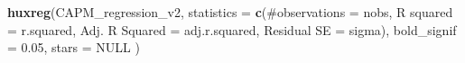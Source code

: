 \documentclass[
]{article}
\newenvironment{Shaded}{\begin{snugshade}}{\end{snugshade}}
\newcommand{\DataTypeTok}[1]{\textcolor[rgb]{0.13,0.29,0.53}{#1}}
\newcommand{\FloatTok}[1]{\textcolor[rgb]{0.00,0.00,0.81}{#1}}
\newcommand{\KeywordTok}[1]{\textcolor[rgb]{0.13,0.29,0.53}{\textbf{#1}}}
\newcommand{\NormalTok}[1]{#1}
\newcommand{\OtherTok}[1]{\textcolor[rgb]{0.56,0.35,0.01}{#1}}
\newcommand{\StringTok}[1]{\textcolor[rgb]{0.31,0.60,0.02}{#1}}
\begin{document}
\begin{Shaded}
\begin{Highlighting}[]
\KeywordTok{huxreg}\NormalTok{(CAPM\_regression\_v2,}
       \DataTypeTok{statistics =} \KeywordTok{c}\NormalTok{(}\StringTok{\textquotesingle{}\#observations\textquotesingle{}}\NormalTok{ =}\StringTok{ \textquotesingle{}nobs\textquotesingle{}}\NormalTok{, }
                      \StringTok{\textquotesingle{}R squared\textquotesingle{}}\NormalTok{ =}\StringTok{ \textquotesingle{}r.squared\textquotesingle{}}\NormalTok{, }
                      \StringTok{\textquotesingle{}Adj. R Squared\textquotesingle{}}\NormalTok{ =}\StringTok{ \textquotesingle{}adj.r.squared\textquotesingle{}}\NormalTok{, }
                      \StringTok{\textquotesingle{}Residual SE\textquotesingle{}}\NormalTok{ =}\StringTok{ \textquotesingle{}sigma\textquotesingle{}}\NormalTok{), }
       \DataTypeTok{bold\_signif =} \FloatTok{0.05}\NormalTok{, }
       \DataTypeTok{stars =} \OtherTok{NULL}
\NormalTok{)}
\end{Highlighting}
\end{Shaded}

 
  \providecommand{\huxb}[2]{\arrayrulecolor[RGB]{#1}\global\arrayrulewidth=#2pt}
  \providecommand{\huxvb}[2]{\color[RGB]{#1}\vrule width #2pt}
  \providecommand{\huxtpad}[1]{\rule{0pt}{#1}}
  \providecommand{\huxbpad}[1]{\rule[-#1]{0pt}{#1}}
\end{document}
